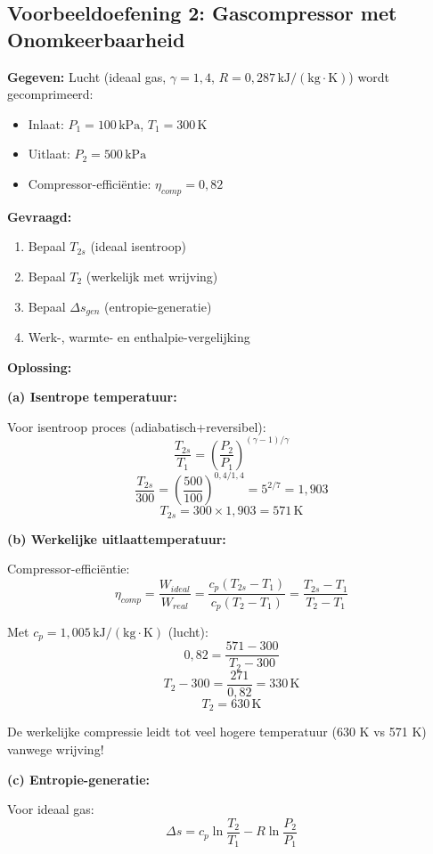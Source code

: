 \documentclass[a4paper,11pt,twoside]{report}
\begin{document}
\subsection*{Voorbeeldoefening 2: Gascompressor met Onomkeerbaarheid}

\textbf{Gegeven:} Lucht (ideaal gas, $\gamma = 1,4$, $R = 0,287\,\mathrm{kJ/(kg \cdot K)}$) wordt gecomprimeerd:
\begin{itemize}
    \item Inlaat: $P_1 = 100\,\mathrm{kPa}$, $T_1 = 300\,\mathrm{K}$
    \item Uitlaat: $P_2 = 500\,\mathrm{kPa}$
    \item Compressor-efficiëntie: $\eta_{comp} = 0,82$
\end{itemize}

\textbf{Gevraagd:}
\begin{enumerate}
    \item Bepaal $T_{2s}$ (ideaal isentroop)
    \item Bepaal $T_2$ (werkelijk met wrijving)
    \item Bepaal $\Delta s_{gen}$ (entropie-generatie)
    \item Werk-, warmte- en enthalpie-vergelijking
\end{enumerate}

\textbf{Oplossing:}

\textbf{(a) Isentrope temperatuur:}

Voor isentroop proces (adiabatisch+reversibel):
\[
\frac{T_{2s}}{T_1} = \left(\frac{P_2}{P_1}\right)^{(\gamma-1)/\gamma}
\]
\[
\frac{T_{2s}}{300} = \left(\frac{500}{100}\right)^{0,4/1,4} = 5^{2/7} = 1,903
\]
\[
T_{2s} = 300 \times 1,903 = 571\,\mathrm{K}
\]

\textbf{(b) Werkelijke uitlaattemperatuur:}

Compressor-efficiëntie:
\[
\eta_{comp} = \frac{W_{ideal}}{W_{real}} = \frac{c_p(T_{2s} - T_1)}{c_p(T_2 - T_1)} = \frac{T_{2s} - T_1}{T_2 - T_1}
\]

Met $c_p = 1,005\,\mathrm{kJ/(kg \cdot K)}$ (lucht):
\[
0,82 = \frac{571 - 300}{T_2 - 300}
\]
\[
T_2 - 300 = \frac{271}{0,82} = 330\,\mathrm{K}
\]
\[
T_2 = 630\,\mathrm{K}
\]

De werkelijke compressie leidt tot veel hogere temperatuur (630 K vs 571 K) vanwege wrijving!

\textbf{(c) Entropie-generatie:}

Voor ideaal gas:
\[
\Delta s = c_p \ln\frac{T_2}{T_1} - R \ln\frac{P_2}{P_1}
\]
\end{document}
